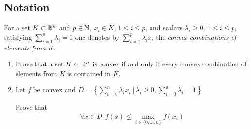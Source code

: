 \documentclass{ExerciseSheet}
\newif\ifsolutions
\begin{document}


\subsection*{Notation}
\vskip 0.5cm 
\begin{problem}

For a set $K\subset \mathbb{R}^n$ and $p\in \mathbb{N}$, $x_i \in K$, $1\leq i\leq p$, and scalars $\lambda_i \geq 0$, $1\leq i\leq p$, satisfying $ \displaystyle\sum_{i=1}^{p}{\lambda_i}=1$ one denotes by $ \displaystyle\sum_{i=1}^{p}{\lambda_i x_i}$ the \emph{convex combinations of elements from $K$}. 

\begin{enumerate}
 \item Prove that a set $K \subset \mathbb{R}^n$ is convex if and only if every convex combination of elements from $K$ is contained in $K$.

 \item Let $f$ be convex and $D = \left\{\displaystyle\sum_{i=0}^{n}\lambda_ix_i ~|~ \lambda_i\geq0, \sum_{i=0}^{n}\lambda_i=1\right\}$
 
       Prove that 
         \begin{align*}
             \forall x\in D ~~ f(x) \leq \displaystyle\max_{i\in\{0,\dots,n\}}f(x_i)
         \end{align*}
 \end{enumerate}

\end{problem}

\ifsolutions
\vskip 0.3cm
\end{document}
